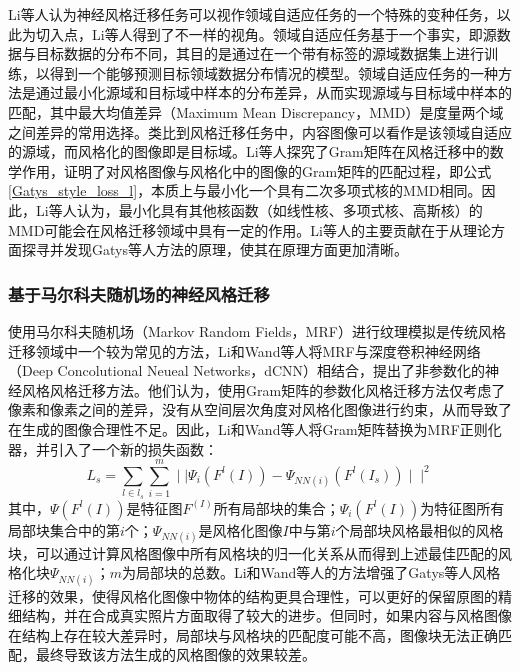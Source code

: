 Li等人\cite{liDemystifyingNeuralStyle2017}认为神经风格迁移任务可以视作领域自适应任务的一个特殊的变种任务，以此为切入点，Li等人得到了不一样的视角。领域自适应任务基于一个事实，即源数据与目标数据的分布不同，其目的是通过在一个带有标签的源域数据集上进行训练，以得到一个能够预测目标领域数据分布情况的模型。领域自适应任务的一种方法是通过最小化源域和目标域中样本的分布差异，从而实现源域与目标域中样本的匹配，其中最大均值差异（Maximum Mean Discrepancy，MMD）是度量两个域之间差异的常用选择。类比到风格迁移任务中，内容图像可以看作是该领域自适应的源域，而风格化的图像即是目标域。Li等人探究了Gram矩阵在风格迁移中的数学作用，证明了对风格图像与风格化中的图像的Gram矩阵的匹配过程，即公式\ref{Gatys_style_loss_l}，本质上与最小化一个具有二次多项式核的MMD相同。因此，Li等人认为，最小化具有其他核函数（如线性核、多项式核、高斯核）的MMD可能会在风格迁移领域中具有一定的作用。Li等人的主要贡献在于从理论方面探寻并发现Gatys等人方法的原理，使其在原理方面更加清晰。

\subsubsection{基于马尔科夫随机场的神经风格迁移}

使用马尔科夫随机场（Markov Random Fields，MRF）进行纹理模拟是传统风格迁移领域中一个较为常见的方法\cite{ChenHongJiYuYangBenXueXiDeXiaoXiangHuaZiDongShengChengSuanFa2003,liMarkovRandomField1994,crossMarkovRandomField1983,chellappaTextureSynthesisCompression1985,bennettMultispectralRandomField1998}，Li和Wand等人\cite{liCombiningMarkovRandom2016}将MRF与深度卷积神经网络（Deep Concolutional Neueal Networks，dCNN）相结合，提出了非参数化的神经风格风格迁移方法。他们认为，使用Gram矩阵的参数化风格迁移方法仅考虑了像素和像素之间的差异，没有从空间层次角度对风格化图像进行约束，从而导致了在生成的图像合理性不足。因此，Li和Wand等人将Gram矩阵替换为MRF正则化器，并引入了一个新的损失函数：
\begin{equation}
    L_s=\sum_{l\in {l_s}}\sum_{i=1}^m \mid\mid\Psi_i(F^l(I))-\Psi_{NN(i)}(F^l(I_s))\mid\mid^2
\end{equation}其中，$\Psi(F^l(I))$是特征图$F^(I)$所有局部块的集合；$\Psi_i(F^l(I))$为特征图所有局部块集合中的第$i$个；$\Psi_{NN(i)}$是风格化图像$I$中与第$i$个局部块风格最相似的风格块，可以通过计算风格图像中所有风格块的归一化关系从而得到上述最佳匹配的风格化块$\Psi_{NN(i)}$；$m$为局部块的总数。Li和Wand等人的方法增强了Gatys等人风格迁移的效果，使得风格化图像中物体的结构更具合理性，可以更好的保留原图的精细结构，并在合成真实照片方面取得了较大的进步。但同时，如果内容与风格图像在结构上存在较大差异时，局部块与风格块的匹配度可能不高，图像块无法正确匹配，最终导致该方法生成的风格图像的效果较差。


